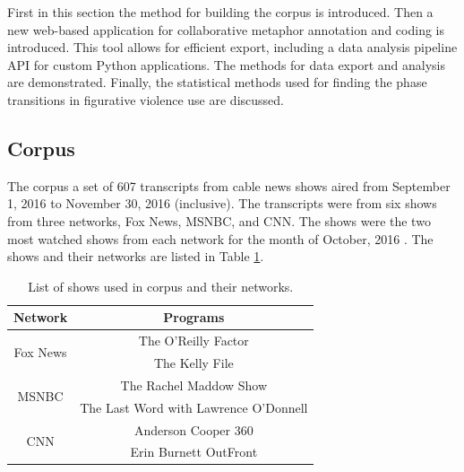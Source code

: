 
First in this section the method for building the corpus is introduced. Then
a new web-based application for collaborative metaphor annotation and coding 
is introduced.  This tool allows for efficient export, including a data 
analysis pipeline API for custom Python applications.  
The methods for data export and analysis are demonstrated. Finally, the
statistical methods used for finding the phase transitions in figurative 
violence use are discussed.

\subsection{Corpus}
\label{subsec:Corpus}

The corpus a set of 607 transcripts from cable news shows aired from
September 1, 2016 to November 30, 2016 (inclusive). The transcripts were from
six shows from three networks, Fox News, MSNBC, and CNN. The shows were the
two most watched shows from each network for the month of
October, 2016 \cite{Katz2016}. The shows and their networks are listed in 
Table \ref{tab:shows}. 

\vspace{.2in}

\begin{table}[!htb]
  \centering
    \begin{tabular}{|c|c|}
      \hline
        Network & Programs \\
      \hline
      \multirow{2}{*}{Fox News} 
        & The O'Reilly Factor \\
        & The Kelly File \\
      \hline
      \multirow{2}{*}{MSNBC}
        & The Rachel Maddow Show \\
        & The Last Word with Lawrence O'Donnell \\
      \hline
      \multirow{2}{*}{CNN}
        & Anderson Cooper 360 \\
        & Erin Burnett OutFront \\
      \hline
    \end{tabular}
  \caption{List of shows used in corpus and their networks.}
  \label{tab:shows}
\end{table}

